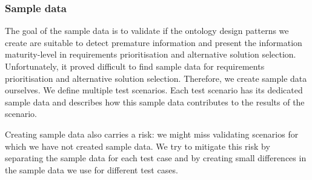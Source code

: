 \subsubsection{Sample data}
The goal of the sample data is to validate if the ontology design patterns we create are suitable to detect premature information and present the information maturity-level in requirements prioritisation and alternative solution selection. Unfortunately, it proved difficult to find sample data for requirements prioritisation and alternative solution selection. Therefore, we create sample data ourselves. We define multiple test scenarios. Each test scenario has its dedicated sample data and describes how this sample data contributes to the results of the scenario. 

Creating sample data also carries a risk: we might miss validating scenarios for which we have not created sample data. We try to mitigate this risk by separating the sample data for each test case and by creating small differences in the sample data we use for different test cases.